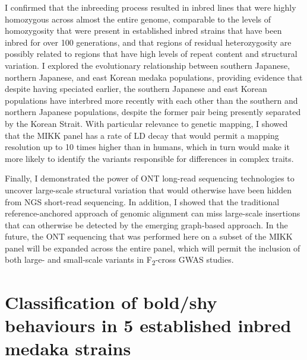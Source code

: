 \documentclass[
]{book}
\begin{document}
I confirmed that the inbreeding process resulted in inbred lines that were highly homozygous across almost the entire genome, comparable to the levels of homozygosity that were present in established inbred strains that have been inbred for over 100 generations, and that regions of residual heterozygosity are possibly related to regions that have high levels of repeat content and structural variation. I explored the evolutionary relationship between southern Japanese, northern Japanese, and east Korean medaka populations, providing evidence that despite having speciated earlier, the southern Japanese and east Korean populations have interbred more recently with each other than the southern and northern Japanese populations, despite the former pair being presently separated by the Korean Strait. With particular relevance to genetic mapping, I showed that the MIKK panel has a rate of LD decay that would permit a mapping resolution up to 10 times higher than in humans, which in turn would make it more likely to identify the variants responsible for differences in complex traits.

Finally, I demonstrated the power of ONT long-read sequencing technologies to uncover large-scale structural variation that would otherwise have been hidden from NGS short-read sequencing. In addition, I showed that the traditional reference-anchored approach of genomic alignment can miss large-scale insertions that can otherwise be detected by the emerging graph-based approach. In the future, the ONT sequencing that was performed here on a subset of the MIKK panel will be expanded across the entire panel, which will permit the inclusion of both large- and small-scale variants in F\textsubscript{2}-cross GWAS studies.

\hypertarget{Pilot-chap}{%
\chapter{Classification of bold/shy behaviours in 5 established inbred medaka strains}\label{Pilot-chap}}

\end{document}
